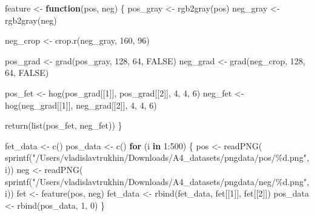 \documentclass[
]{article}
\newenvironment{Shaded}{\begin{snugshade}}{\end{snugshade}}
\newcommand{\ConstantTok}[1]{\textcolor[rgb]{0.00,0.00,0.00}{#1}}
\newcommand{\ControlFlowTok}[1]{\textcolor[rgb]{0.13,0.29,0.53}{\textbf{#1}}}
\newcommand{\DecValTok}[1]{\textcolor[rgb]{0.00,0.00,0.81}{#1}}
\newcommand{\FunctionTok}[1]{\textcolor[rgb]{0.00,0.00,0.00}{#1}}
\newcommand{\NormalTok}[1]{#1}
\newcommand{\OtherTok}[1]{\textcolor[rgb]{0.56,0.35,0.01}{#1}}
\newcommand{\SpecialCharTok}[1]{\textcolor[rgb]{0.00,0.00,0.00}{#1}}
\newcommand{\StringTok}[1]{\textcolor[rgb]{0.31,0.60,0.02}{#1}}
\begin{document}
\begin{Shaded}
\begin{Highlighting}[]
\NormalTok{feature }\OtherTok{\textless{}{-}} \ControlFlowTok{function}\NormalTok{(pos, neg) \{}
\NormalTok{  pos\_gray }\OtherTok{\textless{}{-}} \FunctionTok{rgb2gray}\NormalTok{(pos)}
\NormalTok{  neg\_gray }\OtherTok{\textless{}{-}} \FunctionTok{rgb2gray}\NormalTok{(neg)}
  
\NormalTok{  neg\_crop }\OtherTok{\textless{}{-}} \FunctionTok{crop.r}\NormalTok{(neg\_gray, }\DecValTok{160}\NormalTok{, }\DecValTok{96}\NormalTok{)}
  
\NormalTok{  pos\_grad }\OtherTok{\textless{}{-}} \FunctionTok{grad}\NormalTok{(pos\_gray, }\DecValTok{128}\NormalTok{, }\DecValTok{64}\NormalTok{, }\ConstantTok{FALSE}\NormalTok{) }
\NormalTok{  neg\_grad }\OtherTok{\textless{}{-}} \FunctionTok{grad}\NormalTok{(neg\_crop, }\DecValTok{128}\NormalTok{, }\DecValTok{64}\NormalTok{, }\ConstantTok{FALSE}\NormalTok{)}
  
\NormalTok{  pos\_fet }\OtherTok{\textless{}{-}} \FunctionTok{hog}\NormalTok{(pos\_grad[[}\DecValTok{1}\NormalTok{]], pos\_grad[[}\DecValTok{2}\NormalTok{]], }\DecValTok{4}\NormalTok{, }\DecValTok{4}\NormalTok{, }\DecValTok{6}\NormalTok{)}
\NormalTok{  neg\_fet }\OtherTok{\textless{}{-}} \FunctionTok{hog}\NormalTok{(neg\_grad[[}\DecValTok{1}\NormalTok{]], neg\_grad[[}\DecValTok{2}\NormalTok{]], }\DecValTok{4}\NormalTok{, }\DecValTok{4}\NormalTok{, }\DecValTok{6}\NormalTok{)}
  
  \FunctionTok{return}\NormalTok{(}\FunctionTok{list}\NormalTok{(pos\_fet, neg\_fet))}
\NormalTok{\}}
\end{Highlighting}
\end{Shaded}

\begin{Shaded}
\begin{Highlighting}[]
\NormalTok{fet\_data }\OtherTok{\textless{}{-}} \FunctionTok{c}\NormalTok{()}
\NormalTok{pos\_data }\OtherTok{\textless{}{-}} \FunctionTok{c}\NormalTok{()}
\ControlFlowTok{for}\NormalTok{ (i }\ControlFlowTok{in} \DecValTok{1}\SpecialCharTok{:}\DecValTok{500}\NormalTok{) \{}
\NormalTok{  pos }\OtherTok{\textless{}{-}} \FunctionTok{readPNG}\NormalTok{(}
    \FunctionTok{sprintf}\NormalTok{(}\StringTok{"/Users/vladislavtrukhin/Downloads/A4\_datasets/pngdata/pos/\%d.png"}\NormalTok{, i))}
\NormalTok{  neg }\OtherTok{\textless{}{-}} \FunctionTok{readPNG}\NormalTok{(}
    \FunctionTok{sprintf}\NormalTok{(}\StringTok{"/Users/vladislavtrukhin/Downloads/A4\_datasets/pngdata/neg/\%d.png"}\NormalTok{, i))}
\NormalTok{  fet }\OtherTok{\textless{}{-}} \FunctionTok{feature}\NormalTok{(pos, neg)}
\NormalTok{  fet\_data }\OtherTok{\textless{}{-}} \FunctionTok{rbind}\NormalTok{(fet\_data, fet[[}\DecValTok{1}\NormalTok{]], fet[[}\DecValTok{2}\NormalTok{]])}
\NormalTok{  pos\_data }\OtherTok{\textless{}{-}} \FunctionTok{rbind}\NormalTok{(pos\_data, }\DecValTok{1}\NormalTok{, }\DecValTok{0}\NormalTok{)}
\NormalTok{\}}
\end{Highlighting}
\end{Shaded}
\end{document}
